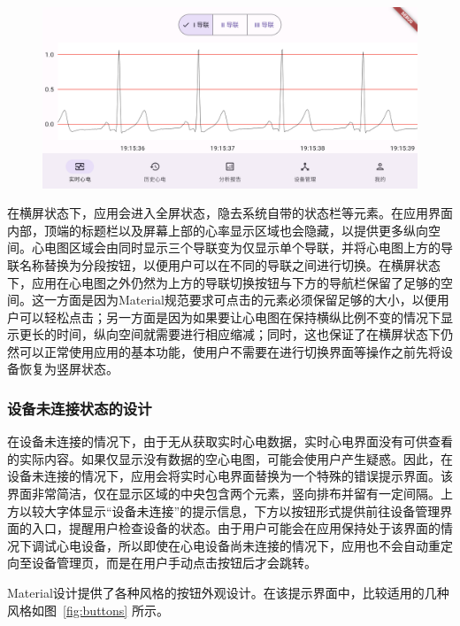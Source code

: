 \begin{figure}[ht]
    \includegraphics[width=\textwidth]{../assets/real-time-landscape}
    \label{fig:real-time-landscape}
\end{figure}

在横屏状态下，应用会进入全屏状态，隐去系统自带的状态栏等元素。在应用界面内部，顶端的标题栏以及屏幕上部的心率显示区域也会隐藏，以提供更多纵向空间。心电图区域会由同时显示三个导联变为仅显示单个导联，并将心电图上方的导联名称替换为分段按钮，以便用户可以在不同的导联之间进行切换。在横屏状态下，应用在心电图之外仍然为上方的导联切换按钮与下方的导航栏保留了足够的空间。这一方面是因为Material规范要求可点击的元素必须保留足够的大小，以便用户可以轻松点击；另一方面是因为如果要让心电图在保持横纵比例不变的情况下显示更长的时间，纵向空间就需要进行相应缩减；同时，这也保证了在横屏状态下仍然可以正常使用应用的基本功能，使用户不需要在进行切换界面等操作之前先将设备恢复为竖屏状态。

\subsubsection{设备未连接状态的设计}\label{subsubsec:real-time-na-design}

在设备未连接的情况下，由于无从获取实时心电数据，实时心电界面没有可供查看的实际内容。如果仅显示没有数据的空心电图，可能会使用户产生疑惑。因此，在设备未连接的情况下，应用会将实时心电界面替换为一个特殊的错误提示界面。该界面非常简洁，仅在显示区域的中央包含两个元素，竖向排布并留有一定间隔。上方以较大字体显示“设备未连接”的提示信息，下方以按钮形式提供前往设备管理界面的入口，提醒用户检查设备的状态。由于用户可能会在应用保持处于该界面的情况下调试心电设备，所以即使在心电设备尚未连接的情况下，应用也不会自动重定向至设备管理页，而是在用户手动点击按钮后才会跳转。

Material设计提供了各种风格的按钮外观设计。在该提示界面中，比较适用的几种风格如图~\ref{fig:buttons} 所示。


